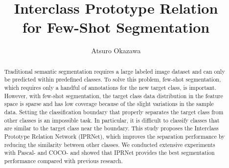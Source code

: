 \documentclass[runningheads]{llncs}
\begin{document}
\pagestyle{headings}
\mainmatter
\def\ECCVSubNumber{3520}  

\title{Interclass Prototype Relation\\ for Few-Shot Segmentation} 

\begin{comment}
\titlerunning{ECCV-22 submission ID \ECCVSubNumber} 
\authorrunning{ECCV-22 submission ID \ECCVSubNumber} 
\author{Anonymous ECCV submission}
\institute{Paper ID \ECCVSubNumber}
\end{comment}




\author{Atsuro Okazawa}
\begin{comment}
\institute{Princeton University, Princeton NJ 08544, USA \and
Springer Heidelberg, Tiergartenstr. 17, 69121 Heidelberg, Germany
\email{lncs@springer.com}\\
\url{http://www.springer.com/gp/computer-science/lncs} \and
ABC Institute, Rupert-Karls-University Heidelberg, Heidelberg, Germany\\
\email{\{abc,lncs\}@uni-heidelberg.de}}
\end{comment}

\maketitle

\begin{abstract}
Traditional semantic segmentation requires a large labeled image dataset and can only be predicted within predefined classes.
To solve this problem, few-shot segmentation, which requires only a handful of annotations for the new target class, is important.
However, with few-shot segmentation, the target class data distribution in the feature space is sparse and has low coverage because of the slight variations in the sample data.
Setting the classification boundary that properly separates the target class from other classes is an impossible task. In particular, it is difficult to classify classes that are similar to the target class near the boundary.
This study proposes the Interclass Prototype Relation Network (IPRNet), which improves the separation performance by reducing the similarity between other classes.
We conducted extensive experiments with Pascal- and COCO- and showed that IPRNet provides the best segmentation performance compared with previous research.
\end{abstract}
\end{document}
